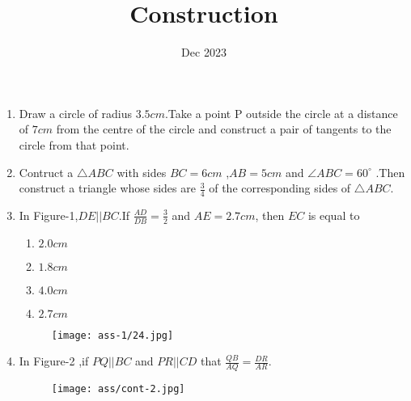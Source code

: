 \documentclass[12pt,-letter paper]{article}
\title{Construction}
\date{Dec 2023}
\begin{document}
\maketitle
\begin{enumerate}
\item Draw a circle of radius $3.5cm$.Take a point P outside the circle at a distance of $7cm$ from the centre of the circle and construct a pair of tangents to the circle from that point.

\item Contruct a $\bigtriangleup ABC $ with sides $BC = 6cm$ ,$AB = 5cm$ and $\angle ABC = 60^{\circ}$ .Then construct a triangle whose sides are $\frac{3}{4}$ of the corresponding sides of $\bigtriangleup ABC$.

\item In Figure-1,$DE || BC $.If $\frac{AD}{DB}=\frac{3}{2}$ and $AE = 2.7cm$, then $EC$ is equal to
\begin{enumerate}
		\item $2.0cm$ \newline
                \item $1.8cm$ \newline
                \item $4.0cm$ \newline
                \item $2.7cm$ \newline
\end{enumerate}
	\begin{figure}[H]
		\centering
		\texttt{[image: ass-1/24.jpg]}
		\caption{}
	\end{figure}

\item In Figure-2 ,if $PQ || BC$ and $PR || CD$ that $\frac{QB}{AQ} = \frac{DR}{AR}$.
	\begin{figure}[H]
		\centering
		\texttt{[image: ass/cont-2.jpg]}
		\caption{}
	\end{figure}

\end{enumerate}
\end{document}

